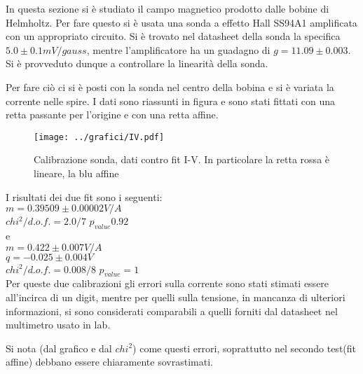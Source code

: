 \documentclass[10pt,a4paper]{article}
\begin{document}
In questa sezione si è studiato il campo magnetico prodotto dalle bobine di Helmholtz. Per fare questo si è usata una sonda a effetto Hall SS94A1 amplificata con un appropriato circuito. Si è trovato nel datasheet della sonda la specifica $5.0\pm 0.1 mV/gauss$, mentre l'amplificatore ha un guadagno di $g=11.09\pm0.003$. Si è provveduto dunque a controllare la linearità della sonda.

Per fare ciò ci si è posti con la sonda nel centro della bobina e si è variata la corrente nelle spire. I dati sono riassunti in figura e sono stati fittati con una retta passante per l'origine e con una retta affine. 

\begin{figure}[H]
	\centering
	\texttt{[image: ../grafici/IV.pdf]}
	\caption{Calibrazione sonda, dati contro fit I-V. In particolare la retta rossa è lineare, la blu affine}
	\label{fig:ex1}
\end{figure}

I risultati dei due fit sono i seguenti:\\
$m=0.39509\pm0.00002 V/A$ \\
$chi^2/d.o.f.=2.0/7$  $p_{value}0.92$\\

e\\

$m=0.422\pm 0.007 V/A$ \\ $q=-0.025\pm 0.004 V$\\
$chi^2/d.o.f.=0.008/8$  $p_{value}=1$\\

Per queste due calibrazioni gli errori sulla corrente sono stati stimati essere all'incirca di un digit, mentre per quelli sulla tensione, in mancanza di ulteriori informazioni, si sono considerati comparabili a quelli forniti dal datasheet nel multimetro usato in lab.

Si nota (dal grafico e dal $chi^2$) come questi errori, soprattutto nel secondo test(fit affine) debbano essere chiaramente sovrastimati.
\end{document}
